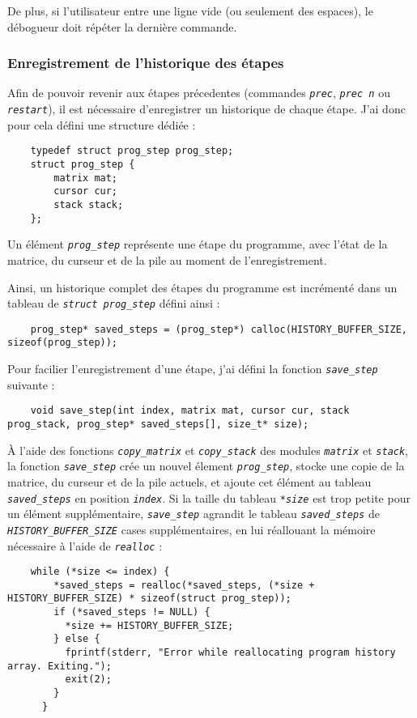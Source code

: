 \documentclass[a4paper,11pt]{article}
\newcommand{\code}[1]{{\itshape\lstinline{#1}}}
\begin{document}
De plus, si l'utilisateur entre une ligne vide (ou seulement des espaces), le débogueur doit répéter la dernière commande.

\subsubsection*{Enregistrement de l'historique des étapes}
Afin de pouvoir revenir aux étapes précedentes (commandes \code{prec}, \code{prec n} ou \code{restart}), il est nécessaire d'enregistrer un historique de chaque étape.
J'ai donc pour cela défini une structure dédiée :
\begin{lstlisting}
    typedef struct prog_step prog_step;
    struct prog_step {
        matrix mat;
        cursor cur;
        stack stack;
    };
\end{lstlisting}

Un élément \code{prog_step} représente une étape du programme, avec l'état de la matrice, du curseur et de la pile au moment de l'enregistrement.

Ainsi, un historique complet des étapes du programme est incrémenté dans un tableau de \code{struct prog_step} défini ainsi :
{\small\begin{lstlisting}
    prog_step* saved_steps = (prog_step*) calloc(HISTORY_BUFFER_SIZE, sizeof(prog_step));
\end{lstlisting}}

Pour facilier l'enregistrement d'une étape, j'ai défini la fonction \code{save_step} suivante :
{\small\begin{lstlisting}
    void save_step(int index, matrix mat, cursor cur, stack prog_stack, prog_step* saved_steps[], size_t* size);
\end{lstlisting}}
À l'aide des fonctions \code{copy_matrix} et \code{copy_stack} des modules \code{matrix} et \code{stack}, la fonction \code{save_step} crée un nouvel élement \code{prog_step}, stocke une copie de la matrice, du curseur et de la pile actuels, et ajoute cet élément au tableau \code{saved_steps} en position \code{index}. Si la taille du tableau \code{*size} est trop petite pour un élément supplémentaire, \code{save_step} agrandit le tableau \code{saved_steps} de \code{HISTORY_BUFFER_SIZE} cases supplémentaires, en lui réallouant la mémoire nécessaire à l'aide de \code{realloc} :

{\small\begin{lstlisting}
    while (*size <= index) {
        *saved_steps = realloc(*saved_steps, (*size + HISTORY_BUFFER_SIZE) * sizeof(struct prog_step));
        if (*saved_steps != NULL) {
          *size += HISTORY_BUFFER_SIZE;
        } else {
          fprintf(stderr, "Error while reallocating program history array. Exiting.");
          exit(2);
        }
      }
\end{lstlisting}}
\end{document}
